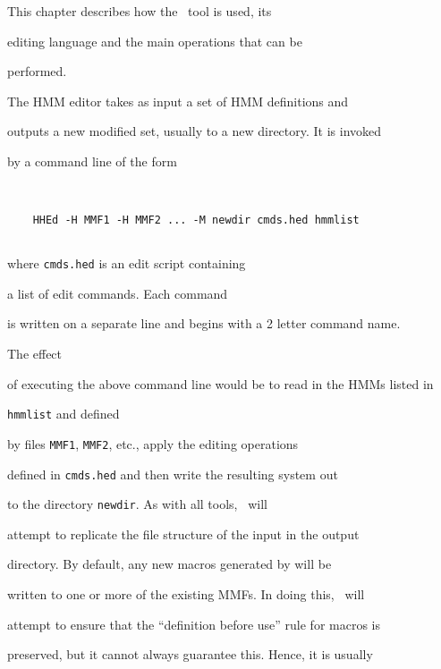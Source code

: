 This chapter describes how the \HTK\ tool  is used,  its


editing language and the main operations that can be


performed.










The HMM editor  takes as input a set of HMM definitions and


outputs a new modified set, usually to a new directory.  It is invoked


by a command line of the form


\begin{verbatim}


    HHEd -H MMF1 -H MMF2 ... -M newdir cmds.hed hmmlist


\end{verbatim}


where \texttt{cmds.hed} is an edit script containing 


a list of edit commands.  Each command


is written on a separate line and begins with a 2 letter command name.







The effect


of  executing the above command line would be to read in the HMMs listed in 


\texttt{hmmlist} and defined


by files \texttt{MMF1}, \texttt{MMF2}, etc., apply  the editing operations


defined in \texttt{cmds.hed} and then write the resulting system out


to the directory \texttt{newdir}.  As with all tools, \HTK\ will


attempt to replicate the file structure of the input in the output


directory.  By default, any new macros generated by  will be


written to one or more of the existing MMFs.  In doing this, \HTK\ will


attempt to ensure that the ``definition before use'' rule for macros is


preserved, but it cannot always guarantee this.  Hence, it is usually


